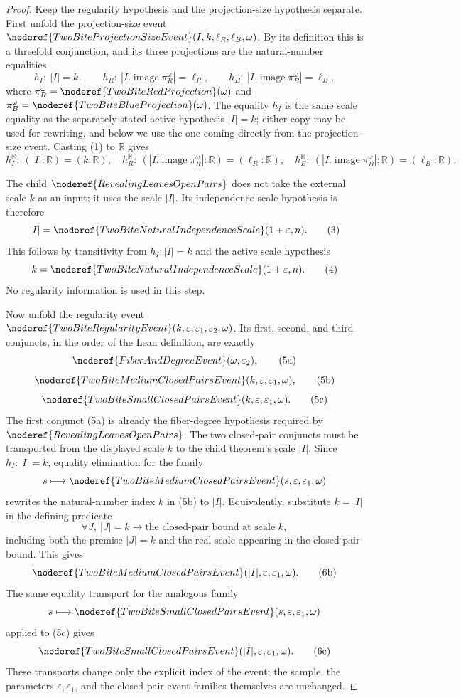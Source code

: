 \begin{proof}
Keep the regularity hypothesis and the projection-size hypothesis separate.
First unfold the projection-size event
\(\noderef{TwoBiteProjectionSizeEvent}(I,k,\ell_R,\ell_B,\omega)\).  By its
definition this is a threefold conjunction, and its three projections are the
natural-number equalities
\[
h_I:\ |I|=k,\qquad
h_R:\ |I.\operatorname{image}\pi_R^\omega|=\ell_R,\qquad
h_B:\ |I.\operatorname{image}\pi_B^\omega|=\ell_B, \tag{1}
\]
where \(\pi_R^\omega=\noderef{TwoBiteRedProjection}(\omega)\) and
\(\pi_B^\omega=\noderef{TwoBiteBlueProjection}(\omega)\).  The equality
\(h_I\) is the same scale equality as the separately stated active hypothesis
\(|I|=k\); either copy may be used for rewriting, and below we use the one
coming directly from the projection-size event.  Casting (1) to \(\mathbb R\)
gives
\[
h_I^{\mathbb R}:\ (|I|:\mathbb R)=(k:\mathbb R),\quad
h_R^{\mathbb R}:\ (|I.\operatorname{image}\pi_R^\omega|:\mathbb R)
   =(\ell_R:\mathbb R),\quad
h_B^{\mathbb R}:\ (|I.\operatorname{image}\pi_B^\omega|:\mathbb R)
   =(\ell_B:\mathbb R). \tag{2}
\]

The child \(\noderef{RevealingLeavesOpenPairs}\) does not take the external
scale \(k\) as an input; it uses the scale \(|I|\).  Its independence-scale
hypothesis is therefore
\[
|I|=\noderef{TwoBiteNaturalIndependenceScale}(1+\varepsilon,n).
\tag{3}
\]
This follows by transitivity from \(h_I:|I|=k\) and the active scale
hypothesis
\[
k=\noderef{TwoBiteNaturalIndependenceScale}(1+\varepsilon,n).
\tag{4}
\]
No regularity information is used in this step.

Now unfold the regularity event
\(\noderef{TwoBiteRegularityEvent}(k,\varepsilon,\varepsilon_1,\varepsilon_2,
\omega)\).  Its first, second, and third conjuncts, in the order of the Lean
definition, are exactly
\[
\noderef{FiberAndDegreeEvent}(\omega,\varepsilon_2), \tag{5a}
\]
\[
\noderef{TwoBiteMediumClosedPairsEvent}(k,\varepsilon,\varepsilon_1,\omega),
\tag{5b}
\]
\[
\noderef{TwoBiteSmallClosedPairsEvent}(k,\varepsilon,\varepsilon_1,\omega).
\tag{5c}
\]
The first conjunct (5a) is already the fiber-degree hypothesis required by
\(\noderef{RevealingLeavesOpenPairs}\).  The two closed-pair conjuncts must be
transported from the displayed scale \(k\) to the child theorem's scale
\(|I|\).  Since \(h_I:|I|=k\), equality elimination for the family
\[
s\longmapsto
\noderef{TwoBiteMediumClosedPairsEvent}(s,\varepsilon,\varepsilon_1,\omega)
\]
rewrites the natural-number index \(k\) in (5b) to \(|I|\).  Equivalently,
substitute \(k=|I|\) in the defining predicate
\[
\forall J,\ |J|=k\to
\text{the closed-pair bound at scale }k,
\]
including both the premise \(|J|=k\) and the real scale appearing in the
closed-pair bound.  This gives
\[
\noderef{TwoBiteMediumClosedPairsEvent}(|I|,\varepsilon,\varepsilon_1,\omega).
\tag{6b}
\]
The same equality transport for the analogous family
\[
s\longmapsto
\noderef{TwoBiteSmallClosedPairsEvent}(s,\varepsilon,\varepsilon_1,\omega)
\]
applied to (5c) gives
\[
\noderef{TwoBiteSmallClosedPairsEvent}(|I|,\varepsilon,\varepsilon_1,\omega).
\tag{6c}
\]
These transports change only the explicit index of the event; the sample,
the parameters \(\varepsilon,\varepsilon_1\), and the closed-pair event
families themselves are unchanged.


\end{proof}
